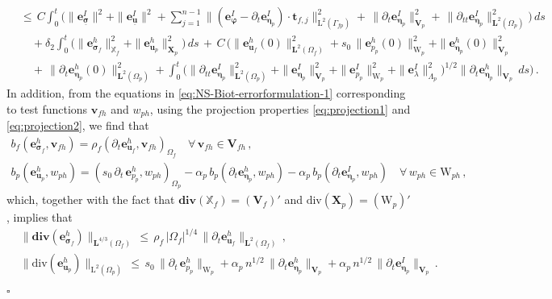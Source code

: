 \documentclass[11pt]{article}
\numberwithin{equation}{section}
\newcommand{\ds}{\displaystyle}
\newcommand{\bbeta}{{\boldsymbol\eta}}
\newcommand{\bsi}{{\boldsymbol\sigma}}
\newcommand{\bvarphi}{{\boldsymbol\varphi}}
\newcommand{\ubsi}{\underline{\bsi}}
\newcommand{\ubu}{\underline{\bu}}
\newcommand{\bv}{{\mathbf{v}}}
\newcommand{\bu}{\mathbf{u}}
\newcommand{\bt}{{\mathbf{t}}}
\newcommand{\be}{{\mathbf{e}}}
\newcommand{\0}{{\mathbf{0}}}
\def\bX{\mathbf{X}}
\def\bV{\mathbf{V}}
\newcommand{\bL}{\mathbf{L}}
\newcommand\bbX{\mathbb{X}}
\def\L{\mathrm{L}}
\def\W{\mathrm{W}}
\def\bdiv{\mathbf{div}}
\def\div{\mathrm{div}}
\newenvironment{proof}{\noindent{\it Proof.}}{\hfill$\square$}
\numberwithin{equation}{section}
\begin{document}
\begin{proof}
\begin{align}
&\ds\leq\, C\int_0^t \Big(\|\be_{\ubsi}^I\|^2
+ \|\be_{\ubu}^I\|^2 
+ \sum^{n-1}_{j=1} \|( \be_{\bvarphi}^I-\partial_t\be_{\bbeta_p}^I)\cdot\bt_{f,j}\|^2_{\L^2(\Gamma_{fp})}  
+ \,\|\partial_{t}\be_{\bbeta_p}^I\|^2_{\bV_p} + \,\|\partial_{tt}\be_{\bbeta_p}^I\|^2_{\bL^2(\Omega_p)} \Big)\,ds  
\nonumber \\[1ex]
&\ds\quad + \delta_2 \int_0^t \Big( \|\be_{\bsi_f}^h\|^2_{\bbX_f}   + \|\be_{\bu_p}^h\|^2_{\bX_p}  \Big)\,ds \,+\, C\,\Bigg( \|\be_{\bu_f}^h(0)\|^2_{\bL^2(\Omega_f)}
+ s_0\,\|\be_{p_p}^h(0)\|^2_{\W_p} 
+ \|\be_{\bbeta_p}^h(0)\|^2_{\bV_p}
\nonumber \\[1ex]
&\ds\quad +\,\|\partial_{t}\be_{\bbeta_p}^h(0)\|^2_{\bL^2(\Omega_p)}
+ \int_0^t \big(\|\partial_{tt}\be_{\bbeta_p}^I\|^2_{\bL^2(\Omega_p)}   
+ \|\be_{\bbeta_p}^I\|^2_{\bV_p}  
+  \|\be_{p_{p}}^I\|^2_{\W_p}  
+ \|\be_{\lambda}^I\|^2_{\Lambda_p} \big)^{1/2}\|\partial_{t}\be_{\bbeta_p}^h\|_{\bV_p}\,ds   
\Bigg) \,.
\end{align}
In addition, from the equations in \eqref{eq:NS-Biot-errorformulation-1} corresponding to
test functions $\bv_{fh}$ and $w_{ph}$,
using the projection properties \eqref{eq:projection1} and \eqref{eq:projection2}, we find
that
%
\begin{equation*}
\begin{array}{c}
\ds b_f(\be^h_{\bsi_f}, \bv_{fh}) =  \rho_f (\partial_t\be_{\bu_f}^h,\bv_{fh})_{\Omega_f} \quad \forall\,\bv_{fh}\in \bV_{fh}\,, \\ [2ex]
\ds b_p(\be^h_{\bu_p}, w_{ph}) = (s_0\,\partial_t\,\be^h_{p_p}, w_{ph})_{\Omega_p}  - \alpha_p\,b_p(\partial_t\be_{\bbeta_p}^h,w_{ph})- \alpha_p\,b_p(\partial_t\be_{\bbeta_p}^I,w_{ph}) \quad \forall\, w_{ph}\in \W_{ph}\,,
\end{array}
\end{equation*}
%
which, together with the fact that $\bdiv(\bbX_f) = (\bV_f)'$ and $\div(\bX_p) = (\W_p)'$, implies that
\begin{align}
&\|\bdiv(\be_{\bsi_f}^h)\|_{\bL^{4/3}(\Omega_f)} 
\,\leq\, \rho_f\,|\Omega_f|^{1/4}\,\|\partial_t\be_{\bu_f}^h\|_{\bL^2(\Omega_f)}\,, \nonumber \\[1ex]
& \|\div(\be^h_{\bu_p})\|_{\L^2(\Omega_p)} 
\,\leq\, s_0\,\|\partial_t\,\be^h_{p_p} \|_{\W_p} 
+ \alpha_p\,n^{1/2}\,\|\partial_t\be_{\bbeta_p}^h\|_{\bV_p}
+ \alpha_p\,n^{1/2}\,\|\partial_t\be_{\bbeta_p}^I\|_{\bV_p}\,.
\label{eq:error-analysis7}
\end{align}
\medskip



\end{proof}
\end{document}
